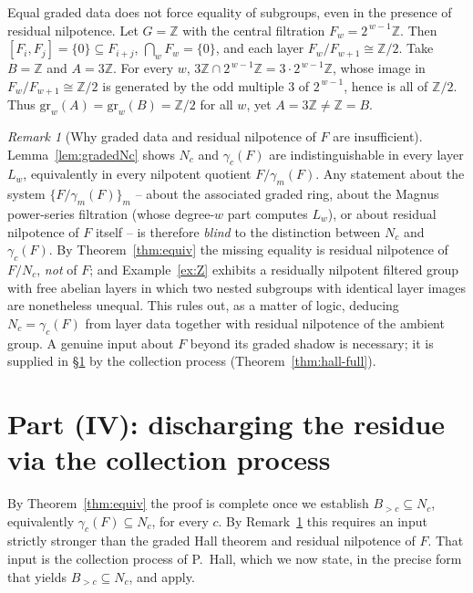 \documentclass{amsart}
\theoremstyle{definition}
\theoremstyle{remark}
\newtheorem{remark}{Remark}
\begin{document}
\begin{example}\label{ex:Z}
Equal graded data does not force equality of subgroups, even in the presence of
residual nilpotence. Let $G=\mathbb Z$ with the central filtration
$F_w=2^{\,w-1}\mathbb Z$. Then $[F_i,F_j]=\{0\}\subseteq F_{i+j}$,
$\bigcap_w F_w=\{0\}$, and each layer $F_w/F_{w+1}\cong\mathbb Z/2$. Take
$B=\mathbb Z$ and $A=3\mathbb Z$. For every $w$,
$3\mathbb Z\cap2^{\,w-1}\mathbb Z=3\cdot2^{\,w-1}\mathbb Z$, whose image in
$F_w/F_{w+1}\cong\mathbb Z/2$ is generated by the odd multiple $3$ of
$2^{\,w-1}$, hence is all of $\mathbb Z/2$. Thus
$\mathrm{gr}_w(A)=\mathrm{gr}_w(B)=\mathbb Z/2$ for all $w$, yet
$A=3\mathbb Z\ne\mathbb Z=B$.
\end{example}

\begin{remark}[Why graded data and residual nilpotence of $F$ are insufficient]
\label{rem:graded-insufficient}
Lemma~\ref{lem:gradedNc} shows $N_c$ and $\gamma_c(F)$ are indistinguishable in
every layer $L_w$, equivalently in every nilpotent quotient $F/\gamma_m(F)$. Any
statement about the system $\{F/\gamma_m(F)\}_m$ -- about the associated graded
ring, about the Magnus power-series filtration (whose degree-$w$ part computes
$L_w$), or about residual nilpotence of $F$ itself -- is therefore \emph{blind} to
the distinction between $N_c$ and $\gamma_c(F)$. By Theorem~\ref{thm:equiv} the
missing equality is residual nilpotence of $F/N_c$, \emph{not} of $F$; and
Example~\ref{ex:Z} exhibits a residually nilpotent filtered group with free
abelian layers in which two nested subgroups with identical layer images are
nonetheless unequal. This rules out, as a matter of logic, deducing
$N_c=\gamma_c(F)$ from layer data together with residual nilpotence of the ambient
group. A genuine input about $F$ beyond its graded shadow is necessary; it is
supplied in \S\ref{sec:final} by the collection process
(Theorem~\ref{thm:hall-full}).
\end{remark}

\section{Part (IV): discharging the residue via the collection process}\label{sec:final}

By Theorem~\ref{thm:equiv} the proof is complete once we establish
$B_{>c}\subseteq N_c$, equivalently $\gamma_c(F)\subseteq N_c$, for every $c$. By
Remark~\ref{rem:graded-insufficient} this requires an input strictly stronger than
the graded Hall theorem and residual nilpotence of $F$. That input is the
collection process of P.~Hall, which we now state, in the precise form that
yields $B_{>c}\subseteq N_c$, and apply.
\end{document}
